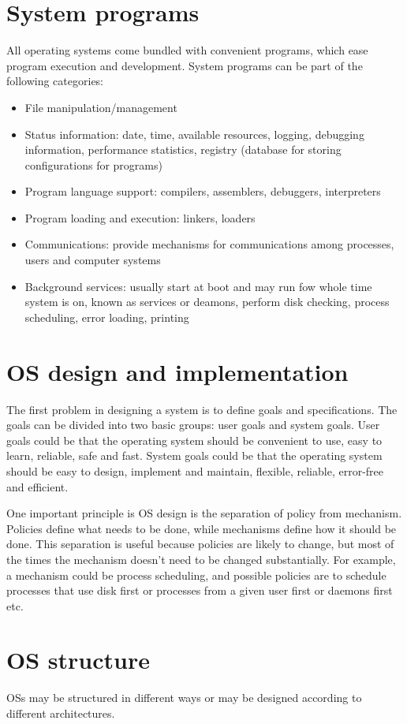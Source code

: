\section{System programs}
All operating systems come bundled with convenient programs, which ease program execution and development. System programs can be part of the following categories:
\begin{itemize}
  \item File manipulation/management
  \item Status information: date, time, available resources, logging, debugging information, performance statistics, registry (database for storing configurations for programs)
  \item Program language support: compilers, assemblers, debuggers, interpreters
  \item Program loading and execution: linkers, loaders
  \item Communications: provide mechanisms for communications among processes, users and computer systems
  \item Background services: usually start at boot and may run fow whole time system is on, known as services or deamons, perform disk checking, process scheduling, error loading, printing
\end{itemize}

\section{OS design and implementation}
The first problem in designing a system is to define goals and specifications. The goals can be divided into two basic groups: user goals and system goals. User goals could be that the operating system should be convenient to use, easy to learn, reliable, safe and fast. System goals could be that the operating system should be easy to design, implement and maintain, flexible, reliable, error-free and efficient.

One important principle is OS design is the separation of policy from mechanism. Policies define what needs to be done, while mechanisms define how it should be done. This separation is useful because policies are likely to change, but most of the times the mechanism doesn't need to be changed substantially. For example, a mechanism could be process scheduling, and possible policies are to schedule processes that use disk first or processes from a given user first or daemons first etc.

\section{OS structure}
OSs may be structured in different ways or may be designed according to different architectures.
